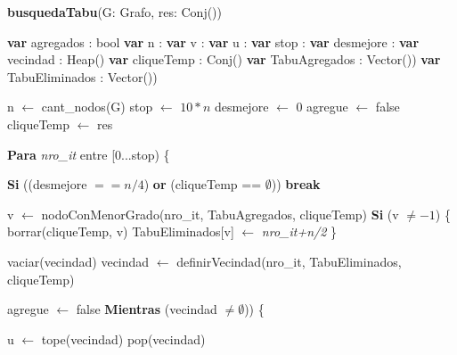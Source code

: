 \textbf{busquedaTabu}(G: Grafo, res: Conj(\entero)) \\
\begin{algorithm}[H]
\footnotesize 
\linesnumbered
\incmargin{3em}

	\BlankLine
	\textbf{var} agregados 		: bool		 													
	\textbf{var} n 				: \entero														{}
	\textbf{var} v 				: \entero														{}
	\textbf{var} u 				: \entero														{}
	\textbf{var} stop				: \entero							 							{}
	\textbf{var} desmejore		: \entero														{}
	\textbf{var} vecindad 		: Heap(\entero)									 			
	\textbf{var} cliqueTemp 		: Conj(\entero) 												
	\textbf{var} TabuAgregados 	: Vector(\entero))											 	
	\textbf{var} TabuEliminados 	: Vector(\entero)) 												
	
	\BlankLine \BlankLine
	n 				$\leftarrow$ cant\_nodos(G)													
	stop 			$\leftarrow$ $10*n$															
	desmejore 		$\leftarrow$ 0																
	agregue 		$\leftarrow$ false																
	cliqueTemp 	$\leftarrow$ res																
	

	\BlankLine \BlankLine		
	\textbf{Para} \textit{nro\_it} entre [0...stop) \{ 												

	\BlankLine	
	\tab \textbf{Si} ((desmejore $== n/4$) \textbf{or} (cliqueTemp == $\emptyset$))		
	\tab \tab \textbf{break}																		

	\BlankLine \BlankLine				
	\tab v $\leftarrow$ nodoConMenorGrado(nro\_it, TabuAgregados, cliqueTemp)				
	\tab \textbf{Si} (v $\neq -1$) \{																
	\tab \tab borrar(cliqueTemp, v) 																	
	\tab \tab TabuEliminados[v] $\leftarrow$ \textit{nro\_it+n/2}			 					
	\tab \}

	\BlankLine \BlankLine		
	\tab vaciar(vecindad)																			
	\tab vecindad $\leftarrow$ definirVecindad(nro\_it, TabuEliminados, cliqueTemp)		 	

	\BlankLine \BlankLine		
	\tab agregue $\leftarrow$ false																
	\tab \textbf{Mientras} (vecindad $\neq \emptyset$)) \{									

	\BlankLine
	\tab \tab u $\leftarrow$ tope(vecindad)														
	\tab \tab pop(vecindad)																		


\end{algorithm}
